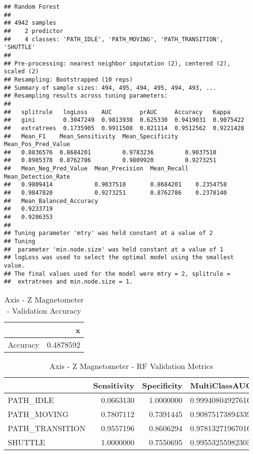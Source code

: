 \documentclass[]{article}
\begin{document}
\begin{verbatim}
## Random Forest 
## 
## 4942 samples
##    2 predictor
##    4 classes: 'PATH_IDLE', 'PATH_MOVING', 'PATH_TRANSITION', 'SHUTTLE' 
## 
## Pre-processing: nearest neighbor imputation (2), centered (2), scaled (2) 
## Resampling: Bootstrapped (10 reps) 
## Summary of sample sizes: 494, 495, 494, 495, 494, 493, ... 
## Resampling results across tuning parameters:
## 
##   splitrule   logLoss    AUC        prAUC     Accuracy   Kappa    
##   gini        0.3047249  0.9813938  0.625330  0.9419031  0.9075422
##   extratrees  0.1735905  0.9911508  0.821114  0.9512562  0.9221428
##   Mean_F1    Mean_Sensitivity  Mean_Specificity  Mean_Pos_Pred_Value
##   0.8836576  0.8684201         0.9783236         0.9037510          
##   0.8985378  0.8762786         0.9809920         0.9273251          
##   Mean_Neg_Pred_Value  Mean_Precision  Mean_Recall  Mean_Detection_Rate
##   0.9809414            0.9037510       0.8684201    0.2354758          
##   0.9847820            0.9273251       0.8762786    0.2378140          
##   Mean_Balanced_Accuracy
##   0.9233719             
##   0.9286353             
## 
## Tuning parameter 'mtry' was held constant at a value of 2
## Tuning
##  parameter 'min.node.size' was held constant at a value of 1
## logLoss was used to select the optimal model using the smallest value.
## The final values used for the model were mtry = 2, splitrule =
##  extratrees and min.node.size = 1.
\end{verbatim}

\begin{table}[!h]

\caption{\label{tab:sensor-z-mag-rf-results}Axis - Z Magnetometer - Validation Accuracy}
\centering
\begin{tabular}[t]{lr}
\toprule
  & x\\
\midrule
Accuracy & 0.4878592\\
\bottomrule
\end{tabular}
\end{table}

\begin{table}[!h]

\caption{\label{tab:sensor-z-mag-rf-results}Axis - Z Magnetometer - RF Validation Metrics}
\centering
\begin{tabular}[t]{lrrl}
\toprule
  & Sensitivity & Specificity & MultiClassAUC\\
\midrule
PATH\_IDLE & 0.0663130 & 1.0000000 & 0.999408049276166\\
PATH\_MOVING & 0.7807112 & 0.7391445 & 0.908751738943393\\
PATH\_TRANSITION & 0.9557196 & 0.8606294 & 0.978132719670164\\
SHUTTLE & 1.0000000 & 0.7550695 & 0.995532559823033\\
\bottomrule
\end{tabular}
\end{table}
\end{document}
